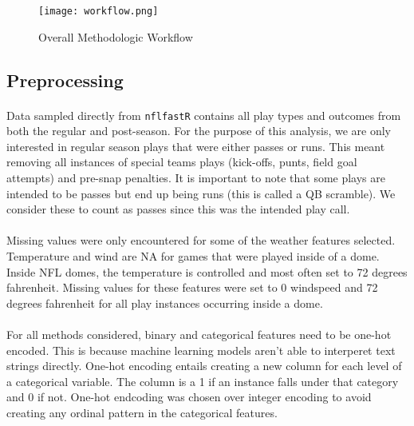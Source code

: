 \documentclass[11pt]{article}
\begin{document}
        \begin{figure}[ht]
            \texttt{[image: workflow.png]}
            \caption{Overall Methodologic Workflow }
            \label{fig:workflow}
        \end{figure}
        \begin{multicols*}{2}

        \subsection{Preprocessing}
            \paragraph{}
                Data sampled directly from \texttt{nflfastR} contains all play types and outcomes from both the regular and post-season. 
                For the purpose of this analysis, we are only interested in regular season plays that were either passes or runs. 
                This meant removing all instances of special teams plays (kick-offs, punts, field goal attempts) and pre-snap penalties. 
                It is important to note that some plays are intended to be passes but end up being runs (this is called a QB scramble). 
                We consider these to count as passes since this was the intended play call.   
            
        \vspace{-10pt}

            \paragraph{}
                Missing values were only encountered for some of the weather features selected.
                Temperature and wind are NA for games that were played inside of a dome. 
                Inside NFL domes, the temperature is controlled and most often set to 72 degrees fahrenheit.
                Missing values for these features were set to 0 windspeed and 72 degrees fahrenheit for all play instances occurring inside a dome. 
            
        \vspace{-10pt}

            \paragraph{}
                For all methods considered, binary and categorical features need to be one-hot encoded.
                This is because machine learning models aren't able to interperet text strings directly. 
                One-hot encoding entails creating a new column for each level of a categorical variable. 
                The column is a 1 if an instance falls under that category and 0 if not. 
                One-hot endcoding was chosen over integer encoding to avoid creating any ordinal pattern in the categorical features. 
        

\end{multicols*}
\end{document}
